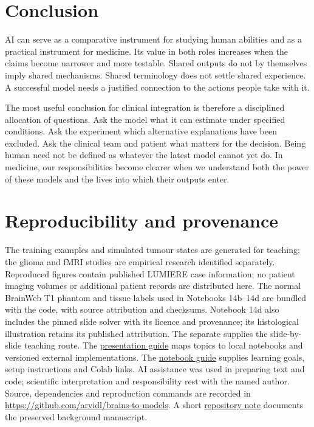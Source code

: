 \documentclass[11pt,a4paper]{article}
\begin{document}

\section{Conclusion}\label{sec:conclusion}
AI can serve as a comparative instrument for studying human abilities and as a practical instrument for medicine. Its value in both roles increases when the claims become narrower and more testable. Shared outputs do not by themselves imply shared mechanisms. Shared terminology does not settle shared experience. A successful model needs a justified connection to the actions people take with it.

The most useful conclusion for clinical integration is therefore a disciplined allocation of questions. Ask the model what it can estimate under specified conditions. Ask the experiment which alternative explanations have been excluded. Ask the clinical team and patient what matters for the decision. Being human need not be defined as whatever the latest model cannot yet do. In medicine, our responsibilities become clearer when we understand both the power of these models and the lives into which their outputs enter.


\section*{Reproducibility and provenance}
The training examples and simulated tumour states are generated for teaching; the glioma and fMRI studies are empirical research identified separately. Reproduced figures contain published LUMIERE case information; no patient imaging volumes or additional patient records are distributed here. The normal BrainWeb T1 phantom and tissue labels used in Notebooks 14b--14d are bundled with the code, with source attribution and checksums. Notebook 14d also includes the pinned slide solver with its licence and provenance; its histological illustration retains its published attribution. The separate  supplies the slide-by-slide teaching route. The \href{https://github.com/arvidl/brains-to-models/blob/main/talk/resources.md}{presentation guide} maps topics to local notebooks and versioned external implementations. The \href{https://github.com/arvidl/brains-to-models/blob/main/code/notebooks/README.md}{notebook guide} supplies learning goals, setup instructions and Colab links. AI assistance was used in preparing text and code; scientific interpretation and responsibility rest with the named author. Source, dependencies and reproduction commands are recorded in \url{https://github.com/arvidl/brains-to-models}. A short \href{https://github.com/arvidl/brains-to-models/blob/main/paper/background/README.md}{repository note} documents the preserved background manuscript.

\FloatBarrier

\FloatBarrier
\clearpage

\end{document}
